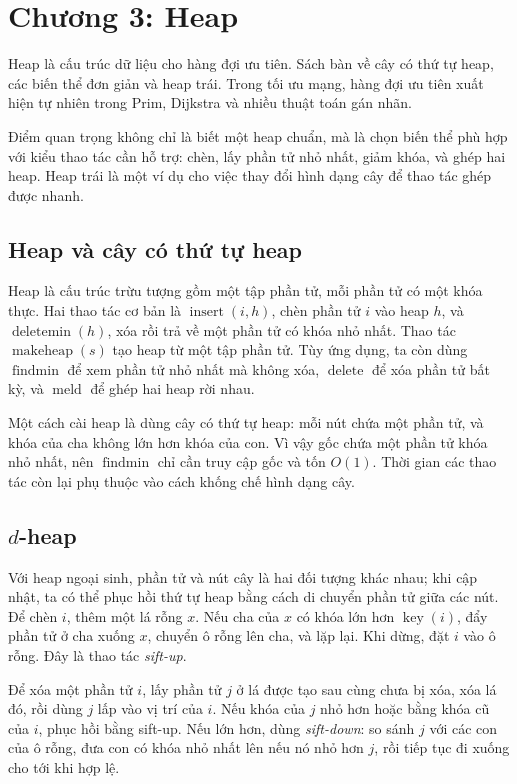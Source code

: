\documentclass[11pt]{article}
\begin{document}
\section{Chương 3: Heap}

Heap là cấu trúc dữ liệu cho hàng đợi ưu tiên. Sách bàn về cây có thứ tự heap,
các biến thể đơn giản và heap trái. Trong tối ưu mạng, hàng đợi ưu tiên xuất
hiện tự nhiên trong Prim, Dijkstra và nhiều thuật toán gán nhãn.

Điểm quan trọng không chỉ là biết một heap chuẩn, mà là chọn biến thể phù hợp
với kiểu thao tác cần hỗ trợ: chèn, lấy phần tử nhỏ nhất, giảm khóa, và ghép
hai heap. Heap trái là một ví dụ cho việc thay đổi hình dạng cây để thao tác
ghép được nhanh.

\subsection*{Heap và cây có thứ tự heap}

Heap là cấu trúc trừu tượng gồm một tập phần tử, mỗi phần tử có một khóa thực.
Hai thao tác cơ bản là \(\operatorname{insert}(i,h)\), chèn phần tử \(i\) vào
heap \(h\), và \(\operatorname{deletemin}(h)\), xóa rồi trả về một phần tử có
khóa nhỏ nhất. Thao tác \(\operatorname{makeheap}(s)\) tạo heap từ một tập phần
tử. Tùy ứng dụng, ta còn dùng \(\operatorname{findmin}\) để xem phần tử nhỏ nhất
mà không xóa, \(\operatorname{delete}\) để xóa phần tử bất kỳ, và
\(\operatorname{meld}\) để ghép hai heap rời nhau.

Một cách cài heap là dùng cây có thứ tự heap: mỗi nút chứa một phần tử, và khóa
của cha không lớn hơn khóa của con. Vì vậy gốc chứa một phần tử khóa nhỏ nhất,
nên \(\operatorname{findmin}\) chỉ cần truy cập gốc và tốn \(O(1)\). Thời gian
các thao tác còn lại phụ thuộc vào cách khống chế hình dạng cây.

\subsection*{\(d\)-heap}

Với heap ngoại sinh, phần tử và nút cây là hai đối tượng khác nhau; khi cập
nhật, ta có thể phục hồi thứ tự heap bằng cách di chuyển phần tử giữa các nút.
Để chèn \(i\), thêm một lá rỗng \(x\). Nếu cha của \(x\) có khóa lớn hơn
\(\operatorname{key}(i)\), đẩy phần tử ở cha xuống \(x\), chuyển ô rỗng lên cha,
và lặp lại. Khi dừng, đặt \(i\) vào ô rỗng. Đây là thao tác \emph{sift-up}.

Để xóa một phần tử \(i\), lấy phần tử \(j\) ở lá được tạo sau cùng chưa bị xóa,
xóa lá đó, rồi dùng \(j\) lấp vào vị trí của \(i\). Nếu khóa của \(j\) nhỏ hơn
hoặc bằng khóa cũ của \(i\), phục hồi bằng sift-up. Nếu lớn hơn, dùng
\emph{sift-down}: so sánh \(j\) với các con của ô rỗng, đưa con có khóa nhỏ
nhất lên nếu nó nhỏ hơn \(j\), rồi tiếp tục đi xuống cho tới khi hợp lệ.
\end{document}
